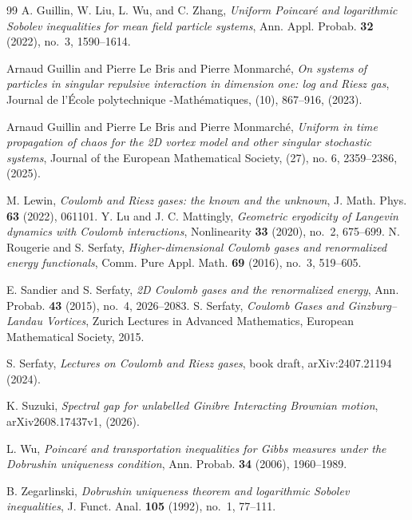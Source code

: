 \documentclass[12pt,reqno,letterpaper]{amsart}
\theoremstyle{definition}
\theoremstyle{remark}
\numberwithin{equation}{section}
\begin{document}
\begin{thebibliography}{99}
A. Guillin, W. Liu, L. Wu, and C. Zhang,
\emph{Uniform Poincar\'e and logarithmic Sobolev inequalities for mean field
particle systems},
Ann. Appl. Probab. \textbf{32} (2022), no.~3, 1590--1614.


Arnaud Guillin and Pierre Le Bris and Pierre Monmarch{\'e},
\emph{On systems of particles in singular repulsive interaction in
 dimension one: log and {R}iesz gas},
Journal de l'\'Ecole polytechnique -Math\'ematiques, (10), 867--916, (2023).
  
Arnaud Guillin and Pierre Le Bris and Pierre Monmarch{\'e}, 
\emph{Uniform in time propagation of chaos for the {2D} vortex model and other singular stochastic systems},
Journal of the European Mathematical Society, (27), no. 6, 2359--2386, (2025). 


M. Lewin,
\emph{Coulomb and Riesz gases: the known and the unknown},
J. Math. Phys. \textbf{63} (2022), 061101.
Y. Lu and J. C. Mattingly,
\emph{Geometric ergodicity of Langevin dynamics with Coulomb interactions},
Nonlinearity \textbf{33} (2020), no.~2, 675--699.
N. Rougerie and S. Serfaty,
\emph{Higher-dimensional Coulomb gases and renormalized energy functionals},
Comm. Pure Appl. Math. \textbf{69} (2016), no.~3, 519--605.

E. Sandier and S. Serfaty,
\emph{2D Coulomb gases and the renormalized energy},
Ann. Probab. \textbf{43} (2015), no.~4, 2026--2083.
S. Serfaty,
\emph{Coulomb Gases and Ginzburg--Landau Vortices},
Zurich Lectures in Advanced Mathematics, European Mathematical Society, 2015.

S. Serfaty,
\emph{Lectures on Coulomb and Riesz gases},
book draft, arXiv:2407.21194 (2024).

K. Suzuki,
\textit{Spectral gap for unlabelled Ginibre Interacting Brownian motion},
arXiv{2608.17437v1}, (2026).

L. Wu,
\emph{Poincar\'e and transportation inequalities for Gibbs measures under the
Dobrushin uniqueness condition}, Ann. Probab. \textbf{34} (2006), 1960--1989.

B. Zegarlinski,
\emph{Dobrushin uniqueness theorem and logarithmic Sobolev inequalities},
J. Funct. Anal. \textbf{105} (1992), no.~1, 77--111.



\end{thebibliography}
\end{document}
